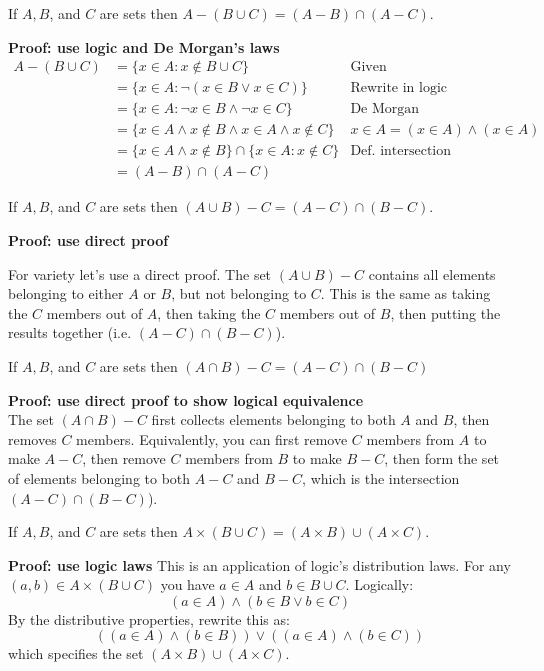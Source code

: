 \documentclass{article}
\begin{document}
\begin{problem}
If $A, B$, and $C$ are sets then $A - (B \cup C) = (A - B) \cap (A - C)$.
\end{problem}
\textbf{Proof: use logic and De Morgan's laws}
\begin{align*}
  A - (B \cup C) & = \{x \in A: x \not\in B \cup C\}                               & \text{Given}                        \\
                 & = \{x \in A: \neg(x \in B \lor x \in C)\}                       & \text{Rewrite in logic}             \\
                 & = \{x \in A: \neg x \in B \land \neg x \in C\}                  & \text{De Morgan}                    \\
                 & = \{x \in A \land x \not\in B \land x \in A \land x \not\in C\} & x \in A = (x \in A) \land (x \in A) \\
                 & = \{x \in A \land x \not\in B\} \cap \{x \in A: x \not\in C\}   & \text{Def. intersection}            \\
                 & = (A - B) \cap (A - C)
\end{align*}

\begin{problem}
If $A, B$, and $C$ are sets then $(A \cup B) - C = (A - C) \cap (B - C)$.
\end{problem}
\textbf{Proof: use direct proof}

For variety let's use a direct proof. The set $(A \cup B) - C$ contains all elements belonging to either $A$ or $B$, but not belonging to $C$. This is the same as taking the $C$ members out of $A$, then taking the $C$ members out of $B$, then putting the results together (i.e. $(A - C) \cap (B - C)$).

\begin{problem}
If $A, B$, and $C$ are sets then $(A \cap B) - C = (A - C) \cap (B - C)$
\end{problem}
\textbf{Proof: use direct proof to show logical equivalence}
\\
The set $(A \cap B) - C$ first collects elements belonging to both $A$ and $B$, then removes $C$ members. Equivalently, you can first remove $C$ members from $A$ to make $A - C$, then remove $C$ members from $B$ to make $B - C$, then form the set of elements belonging to both $A - C$ and $B - C$, which is the intersection $(A - C) \cap (B - C)$).

\begin{problem}
If $A, B$, and $C$ are sets then $A \times (B \cup C) = (A \times B) \cup (A \times C)$.
\end{problem}
\textbf{Proof: use logic laws}
This is an application of logic's distribution laws. For any $(a, b) \in A \times (B \cup C)$ you have $a \in A$ and $b \in B \cup C$. Logically:
$$(a \in A) \land (b \in B \lor b \in C)$$
By the distributive properties, rewrite this as:
$$((a \in A) \land (b \in B)) \lor ((a \in A) \land (b \in C))$$
which specifies the set $(A \times B) \cup (A \times C)$.
\end{document}
